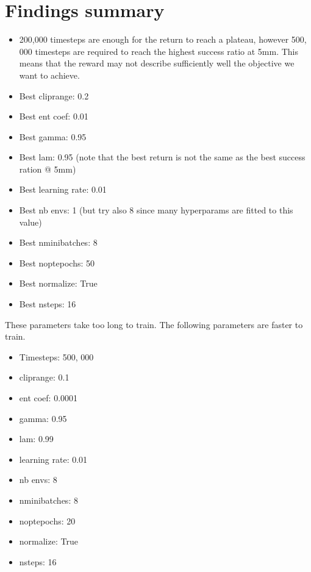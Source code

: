 \documentclass{article}
\begin{document}
\section{Findings summary}


\begin{itemize}
  \item 200,000 timesteps are enough for the return to reach a plateau, however 500, 000 timesteps are required to reach the highest success ratio at 5mm. This means that the reward may not describe sufficiently well the objective we want to achieve.
  \item Best cliprange: 0.2
  \item Best ent coef: 0.01
  \item Best gamma: 0.95
  \item Best lam: 0.95 (note that the best return is not the same as the best success ration @ 5mm)
  \item Best learning rate: 0.01
  \item Best nb envs: 1 (but try also 8 since many hyperparams are fitted to this value)
  \item Best nminibatches: 8
  \item Best noptepochs: 50
  \item Best normalize: True
  \item Best nsteps: 16
\end{itemize} 


These parameters take too long to train. The following parameters are faster to train.

\begin{itemize}
  \item Timesteps: 500, 000
  \item cliprange: 0.1
  \item ent coef: 0.0001
  \item gamma: 0.95
  \item lam: 0.99
  \item learning rate: 0.01
  \item nb envs: 8
  \item nminibatches: 8
  \item noptepochs: 20
  \item normalize: True
  \item nsteps: 16
\end{itemize} 
\end{document}
